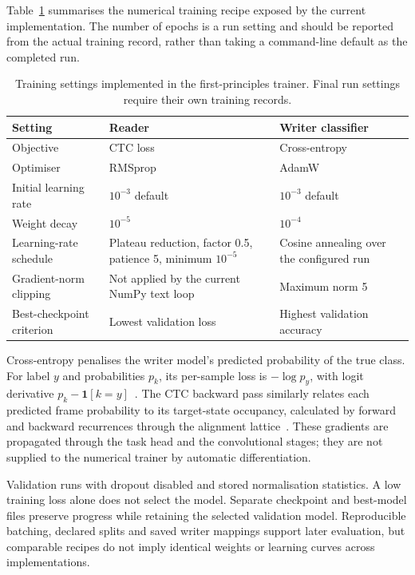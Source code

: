 Table~\ref{tab:des-training} summarises the numerical training recipe exposed by the current implementation. The number of epochs is a run setting and should be reported from the actual training record, rather than taking a command-line default as the completed run.
\begin{table}[!htbp]\centering\small
\begin{tabularx}{\linewidth}{|l|X|X|}
\hline\textbf{Setting}&\textbf{Reader}&\textbf{Writer classifier}\\\hline
Objective&CTC loss&Cross-entropy\\\hline
Optimiser&RMSprop&AdamW\\\hline
Initial learning rate&$10^{-3}$ default&$10^{-3}$ default\\\hline
Weight decay&$10^{-5}$&$10^{-4}$\\\hline
Learning-rate schedule&Plateau reduction, factor 0.5, patience 5, minimum $10^{-5}$&Cosine annealing over the configured run\\\hline
Gradient-norm clipping&Not applied by the current NumPy text loop&Maximum norm 5\\\hline
Best-checkpoint criterion&Lowest validation loss&Highest validation accuracy\\\hline
\end{tabularx}
\caption{Training settings implemented in the first-principles trainer. Final run settings require their own training records.}
\label{tab:des-training}
\end{table}

Cross-entropy penalises the writer model's predicted probability of the true class. For label $y$ and probabilities $p_k$, its per-sample loss is $-\log p_y$, with logit derivative $p_k-\mathbf{1}[k=y]$~\cite[p.~6, Eqs.~(13)--(14)]{graves2013}. The CTC backward pass similarly relates each predicted frame probability to its target-state occupancy, calculated by forward and backward recurrences through the alignment lattice~\cite[PDF pp.~4--6]{graves2006}. These gradients are propagated through the task head and the convolutional stages; they are not supplied to the numerical trainer by automatic differentiation.

Validation runs with dropout disabled and stored normalisation statistics. A low training loss alone does not select the model. Separate checkpoint and best-model files preserve progress while retaining the selected validation model. Reproducible batching, declared splits and saved writer mappings support later evaluation, but comparable recipes do not imply identical weights or learning curves across implementations.

